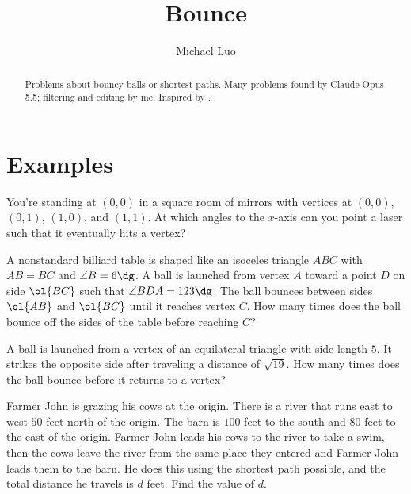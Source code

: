 \documentclass[11pt]{scrartcl}
\author{Michael Luo}
\title{Bounce}
\begin{document}
\maketitle

\begin{abstract}
    Problems about bouncy balls or shortest paths. Many problems found by Claude Opus 5.5; filtering and editing by me. Inspired by .
\end{abstract}

\section{Examples}

\begin{example}
    You're standing at $(0,0)$ in a square room of mirrors with vertices at $(0,0)$, $(0,1)$, $(1,0)$, and $(1,1)$. At which angles to the $x$-axis can you point a laser such that it eventually hits a vertex?
\end{example}

\begin{example} %
    \label{exa:mnhsml}
    A nonstandard billiard table is shaped like an isoceles triangle $ABC$ with $AB = BC$ and $\angle B = 6\dg$. A ball is launched from vertex $A$ toward a point $D$ on side $\ol{BC}$ such that $\angle BDA = 123\dg$. The ball bounces between sides $\ol{AB}$ and $\ol{BC}$ until it reaches vertex $C$. How many times does the ball bounce off the sides of the table before reaching $C$?
\end{example}

\begin{example} %
    A ball is launched from a vertex of an equilateral triangle with side length $5$. It strikes the opposite side after traveling a distance of $\sqrt{19}$. How many times does the ball bounce before it returns to a vertex?
\end{example}

\begin{example} %
    Farmer John is grazing his cows at the origin. There is a river that runs east to west $50$ feet north of the origin. The barn is $100$ feet to the south and $80$ feet to the east of the origin. Farmer John leads his cows to the river to take a swim, then the cows leave the river from the same place they entered and Farmer John leads them to the barn. He does this using the shortest path possible, and the total distance he travels is $d$ feet. Find the value of $d$.
\end{example}
\end{document}
